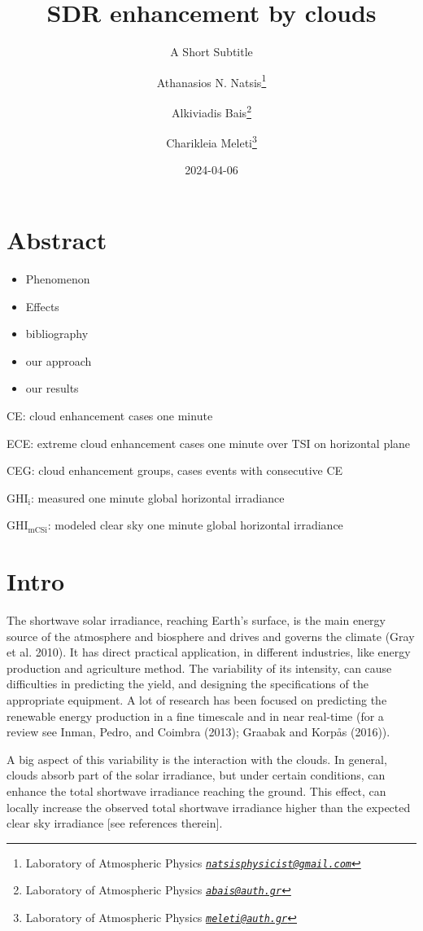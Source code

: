 \documentclass[
]{article}
\title{SDR enhancement by clouds}
\subtitle{A Short Subtitle}
\author{Athanasios N. Natsis\footnote{Laboratory of Atmospheric Physics \emph{\href{mailto:natsisphysicist@gmail.com}{\nolinkurl{natsisphysicist@gmail.com}}}} \and Alkiviadis Bais\footnote{Laboratory of Atmospheric Physics \emph{\href{mailto:abais@auth.gr}{\nolinkurl{abais@auth.gr}}}} \and Charikleia Meleti\footnote{Laboratory of Atmospheric Physics \emph{\href{mailto:meleti@auth.gr}{\nolinkurl{meleti@auth.gr}}}}}
\date{2024-04-06}
\providecommand{\tightlist}{%
  \setlength{\itemsep}{0pt}\setlength{\parskip}{0pt}}
\begin{document}
\maketitle

{
\setcounter{tocdepth}{4}
\tableofcontents
}
\hypertarget{abstract}{%
\section*{Abstract}\label{abstract}}

\begin{itemize}
\tightlist
\item
  Phenomenon
\item
  Effects
\item
  bibliography
\item
  our approach
\item
  our results
\end{itemize}

CE: cloud enhancement cases one minute

ECE: extreme cloud enhancement cases one minute over TSI on horizontal plane

CEG: cloud enhancement groups, cases events with consecutive CE

\(\text{GHI}_\text{i}\): measured one minute global horizontal irradiance

\(\text{GHI}_\text{mCSi}\): modeled clear sky one minute global horizontal irradiance

\hypertarget{intro}{%
\section{Intro}\label{intro}}

The shortwave solar irradiance, reaching Earth's surface, is the main energy source
of the atmosphere and biosphere and drives and governs the climate (Gray et al. 2010). It
has direct practical application, in different industries, like energy production and
agriculture method. The variability of its intensity, can cause difficulties in
predicting the yield, and designing the specifications of the appropriate equipment.
A lot of research has been focused on predicting the renewable energy production in a
fine timescale and in near real-time (for a review see Inman, Pedro, and Coimbra (2013); Graabak and Korpås (2016)).

A big aspect of this variability is the interaction with the clouds. In general,
clouds absorb part of the solar irradiance, but under certain conditions, can enhance
the total shortwave irradiance reaching the ground. This effect, can locally increase
the observed total shortwave irradiance higher than the expected clear sky irradiance
{[}see references therein{]}.
\end{document}
